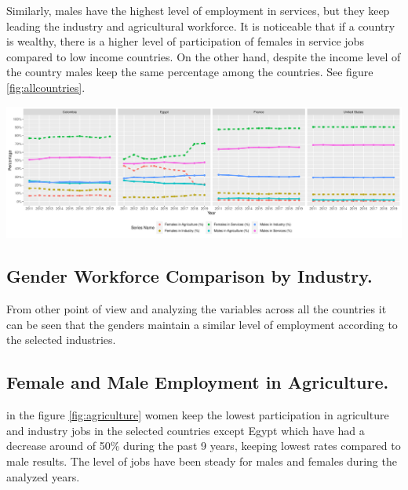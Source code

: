 \documentclass[11pt,a4paper,]{article}
\let\origfigure\figure
\let\endorigfigure\endfigure
\renewenvironment{figure}[1][2] {
    \expandafter\origfigure\expandafter[H]
} {
    \endorigfigure
}
\begin{document}
Similarly, males have the highest level of employment in services, but they keep leading the industry and agricultural workforce. It is noticeable that if a country is wealthy, there is a higher level of participation of females in service jobs compared to low income countries. On the other hand, despite the income level of the country males keep the same percentage among the countries. See figure \ref{fig:allcountries}.

\begin{figure}
\centering
\includegraphics{The_Outsiders_5513_files/figure-latex/allcountries-1.pdf}
\caption{\label{fig:allcountries}Gender Workforce Distribution by Country}
\end{figure}

\hypertarget{gender-workforce-comparison-by-industry.}{%
\subsection{Gender Workforce Comparison by Industry.}\label{gender-workforce-comparison-by-industry.}}

From other point of view and analyzing the variables across all the countries it can be seen that the genders maintain a similar level of employment according to the selected industries.

\hypertarget{female-and-male-employment-in-agriculture.}{%
\subsection{Female and Male Employment in Agriculture.}\label{female-and-male-employment-in-agriculture.}}

in the figure \ref{fig:agriculture} women keep the lowest participation in agriculture and industry jobs in the selected countries except Egypt which have had a decrease around of 50\% during the past 9 years, keeping lowest rates compared to male results. The level of jobs have been steady for males and females during the analyzed years.
\end{document}
